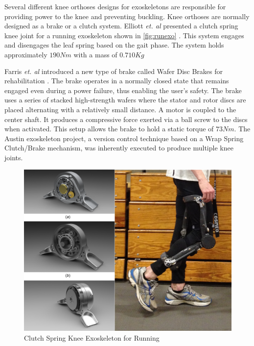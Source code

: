 Several different knee orthoses designs for exoskeletons are responsible for providing power to the knee and preventing buckling. Knee orthoses are normally designed as a brake or a clutch system. Elliott \textit{et. al} presented a clutch spring knee joint for a running exoskeleton shown in \autoref{fig:runexo} \cite{elliott2014design}. This system engages and disengages the leaf spring based on the gait phase. The system holds approximately $190Nm$ with a mass of $0.710Kg$

Farris \textit{et. al} introduced a new type of brake called Wafer Disc Brakes for rehabilitation \cite{farris2009design}. The brake operates in a normally closed state that remains engaged even during a power failure, thus enabling the user's safety. The brake uses a series of stacked high-strength wafers where the stator and rotor discs are placed alternating with a relatively small distance. A motor is coupled to the center shaft. It produces a compressive force exerted via a ball screw to the discs when activated. This setup allows the brake to hold a static torque of $73Nm$. The Austin exoskeleton project, a version control technique based on a Wrap Spring Clutch/Brake mechanism, was inherently executed to produce multiple knee joints.
 
 
 \begin{figure}[h]
    \centering
    \includegraphics[scale=0.30, frame]{images/background/clutch.png}
    \caption[Clutch Spring Knee]{Clutch Spring Knee Exoskeleton for Running \cite{elliott2014design}}
    \label{fig:runexo}
\end{figure} 


